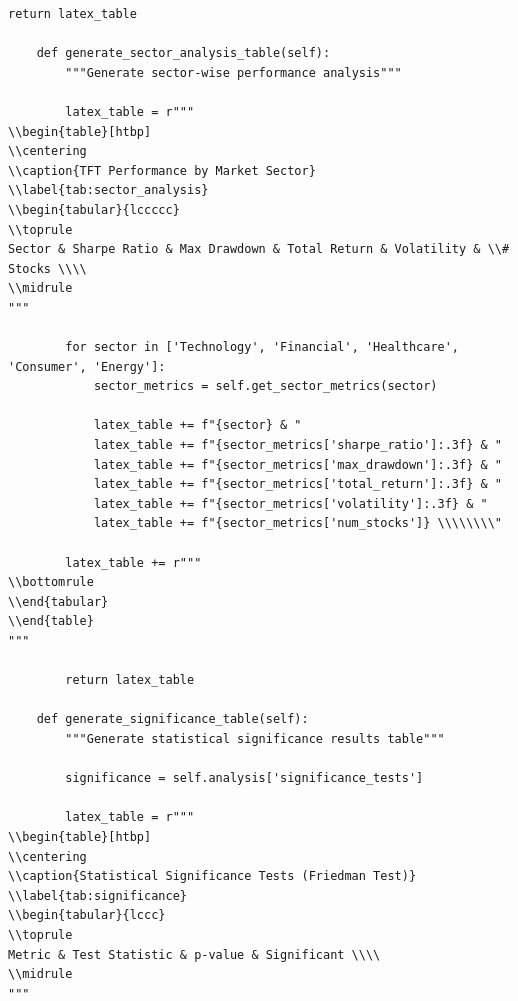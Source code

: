 \documentclass[11pt]{article}
\begin{document}
\begin{lstlisting}[style=pythonstyle, caption=Automated Paper Generation]
        return latex_table
        
    def generate_sector_analysis_table(self):
        """Generate sector-wise performance analysis"""
        
        latex_table = r"""
\\begin{table}[htbp]
\\centering
\\caption{TFT Performance by Market Sector}
\\label{tab:sector_analysis}
\\begin{tabular}{lccccc}
\\toprule
Sector & Sharpe Ratio & Max Drawdown & Total Return & Volatility & \\# Stocks \\\\
\\midrule
"""
        
        for sector in ['Technology', 'Financial', 'Healthcare', 'Consumer', 'Energy']:
            sector_metrics = self.get_sector_metrics(sector)
            
            latex_table += f"{sector} & "
            latex_table += f"{sector_metrics['sharpe_ratio']:.3f} & "
            latex_table += f"{sector_metrics['max_drawdown']:.3f} & "
            latex_table += f"{sector_metrics['total_return']:.3f} & "
            latex_table += f"{sector_metrics['volatility']:.3f} & "
            latex_table += f"{sector_metrics['num_stocks']} \\\\\\\\"
            
        latex_table += r"""
\\bottomrule
\\end{tabular}
\\end{table}
"""
        
        return latex_table
        
    def generate_significance_table(self):
        """Generate statistical significance results table"""
        
        significance = self.analysis['significance_tests']
        
        latex_table = r"""
\\begin{table}[htbp]
\\centering
\\caption{Statistical Significance Tests (Friedman Test)}
\\label{tab:significance}
\\begin{tabular}{lccc}
\\toprule
Metric & Test Statistic & p-value & Significant \\\\
\\midrule
"""
        

\end{lstlisting}
\end{document}
